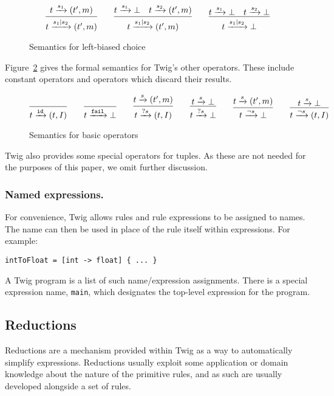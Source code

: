 \begin{figure}[ht]
\[
\infer{t \arr{s_1|s_2} (t',m)}{t \arr{s_1} (t',m)}
\qquad 
\infer{t \arr{s_1|s_2} (t',m)}{t \arr{s_1} \bot \quad t \arr{s_2} (t',m)}
\qquad
\infer{t \arr{s_1|s_2} \bot}{t \arr{s_1} \bot \quad t \arr{s_2} \bot}
\]
\caption{Semantics for left-biased choice}
\label{semantics:choice}
\end{figure}

Figure~\ref{semantics:basic} gives the formal semantics for Twig's other operators. These include constant operators and operators which discard their results.

\begin{figure}[ht]
\[
\infer{t \arr{\mathtt{id}} (t,I)}{}
\qquad
\infer{t \arr{\mathtt{fail}} \bot}{}
\qquad
\infer{t \arr{?s} (t,I)}{t \arr{s} (t',m)}
\qquad 
\infer{t \arr{?s} \bot}{t \arr{s} \bot}
\qquad
\infer{t \arr{\lnot s} \bot}{t \arr{s} (t',m)}
\qquad 
\infer{t \arr{\lnot s} (t,I)}{t \arr{s} \bot}
\]
\caption{Semantics for basic operators}
\label{semantics:basic}
\end{figure}

Twig also provides some special operators for tuples. As these are not needed for the purposes of this paper, we omit further discussion.

\subsubsection{Named expressions.}
\label{section:names}

For convenience, Twig allows rules and rule expressions to be assigned to names. The name can then be used in place of the rule itself within expressions. For example:

\begin{verbatim}
intToFloat = [int -> float] { ... }
\end{verbatim}

A Twig program is a list of such name/expression assignments. There is a special expression name, \texttt{main}, which designates the top-level expression for the program.

\subsection{Reductions}
\label{sec:reductions}

Reductions are a mechanism provided within Twig as a way to automatically simplify expressions. Reductions usually exploit some application or domain knowledge about the nature of the primitive rules, and as such are usually developed alongside a set of rules.

